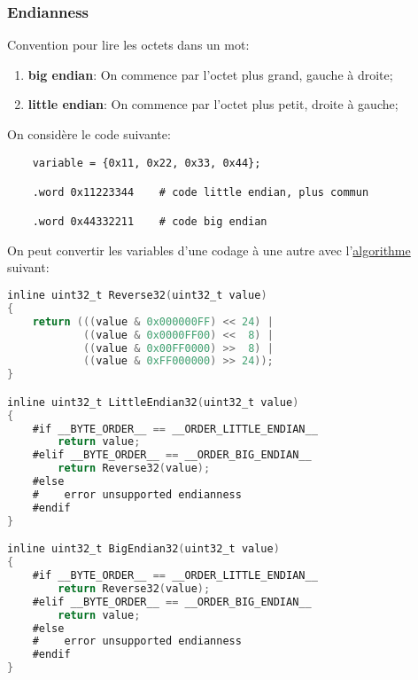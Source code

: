 \documentclass{article}
\begin{document}
\subsubsection{Endianness}
\begin{definition}
    Convention pour lire les octets dans un mot:
    \begin{enumerate}[noitemsep]
        \item \textbf{big endian}: On commence par l'octet plus grand, gauche à droite;
        \item \textbf{little endian}: On commence par l'octet plus petit, droite à gauche;
    \end{enumerate}
    
    \begin{example}
        On considère le code suivante:
        \begin{scriptsize}\myRISCV
            \begin{lstlisting}
    variable = {0x11, 0x22, 0x33, 0x44};
    
    .word 0x11223344    # code little endian, plus commun
    
    .word 0x44332211    # code big endian
            \end{lstlisting}
        \end{scriptsize}
    \end{example}

    On peut convertir les variables d'une codage à une autre avec l'\href{https://codereview.stackexchange.com/questions/151049/endianness-conversion-in-c}{algorithme} suivant:
    \begin{scriptsize}\mycode
        \begin{lstlisting}[language=C, linerange={1-7}]
inline uint32_t Reverse32(uint32_t value) 
{
    return (((value & 0x000000FF) << 24) |
            ((value & 0x0000FF00) <<  8) |
            ((value & 0x00FF0000) >>  8) |
            ((value & 0xFF000000) >> 24));
}

inline uint32_t LittleEndian32(uint32_t value)
{
    #if __BYTE_ORDER__ == __ORDER_LITTLE_ENDIAN__
        return value;
    #elif __BYTE_ORDER__ == __ORDER_BIG_ENDIAN__
        return Reverse32(value);
    #else
    #    error unsupported endianness
    #endif
}

inline uint32_t BigEndian32(uint32_t value)
{
    #if __BYTE_ORDER__ == __ORDER_LITTLE_ENDIAN__
        return Reverse32(value);
    #elif __BYTE_ORDER__ == __ORDER_BIG_ENDIAN__
        return value;
    #else
    #    error unsupported endianness
    #endif
}
        \end{lstlisting}
    \end{scriptsize}
\end{definition}
\end{document}
